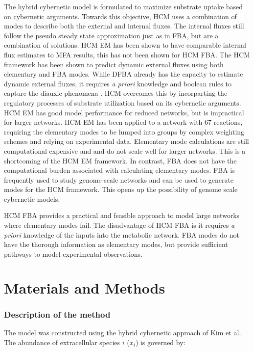 \documentclass[10pt,twocolumn,twoside,final]{IEEEtran}
\begin{document}
The hybrid cybernetic model is formulated to maximize substrate uptake based on cybernetic arguments. 
Towards this objective, HCM uses a combination of modes to describe both the external and internal fluxes. 
The internal fluxes still follow the pseudo steady state approximation just as in FBA, but are a combination of solutions.
HCM EM has been shown to have comparable internal flux estimates to MFA results\cite{2008_kim_varner_ramkrishna_BiotechProg}, this has not been shown for HCM FBA.
The HCM framework has been shown to predict dynamic external fluxes using both elementary and FBA modes.
While DFBA already has the capacity to estimate dynamic external fluxes, it requires \textit{a priori} knowledge and boolean rules to capture the diauxic phenomena \cite{1994_varma_palsson_ApplEnvMicro,2002_Mahadevan_BiophysJ,2001_covert_schilling_palsson}.  
HCM overcomes this by incorparting the regulatory processes of substrate utilization based on its cybernetic arguments. 
HCM EM has good model performance for reduced networks, but is impractical for larger networks.
HCM EM has been applied to a network with 67 reactions, requiring the elementary modes to be lumped into groups by complex weighting schemes and relying on experimental data\cite{2010_song_ramkrishna}.
Elementary mode calculations are still computational expensive and and do not scale well for larger networks\cite{2004_lee_varner_ko_ieee}. 
This is a shortcoming of the HCM EM framework.
In contrast, FBA does not have the computational burden associated with calculating elementary modes.  
FBA is frequently used to study genome-scale networks\cite{2010_orth_NatBiotech} and can be used to generate modes for the HCM framework. 
This opens up the possibility of genome scale cybernetic models.

HCM FBA provides a practical and feasible approach to model large networks where elementary modes fail.
The disadvantage of HCM FBA is it requires \textit{a priori} knowledge of the inputs into the metabolic network.
FBA modes do not have the thorough information as elementary modes, but provide sufficient pathways to model experimental observations.

\section{Materials and Methods}

\noindent\subsubsection*{Description of the method}
The model was constructed using the hybrid cybernetic approach of Kim et al.\cite{2008_kim_varner_ramkrishna_BiotechProg}. 
The abundance of extracellular species $i$ ($x_{i}$) is governed by:
\end{document}
